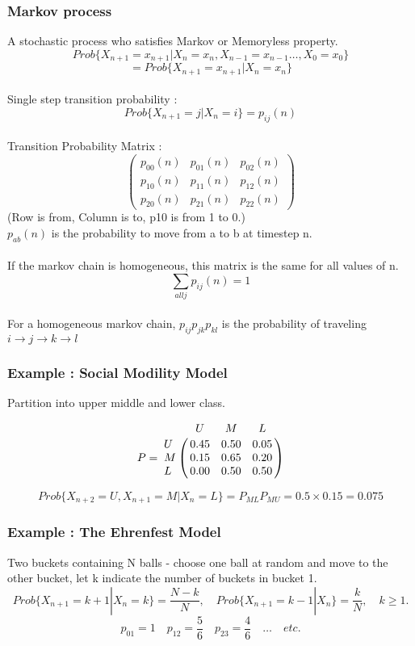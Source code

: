 \documentclass{article}
\begin{document}
	\subsubsection{Markov process}
	A stochastic process who satisfies Markov or Memoryless property. 
	\[Prob\{ X_{n+1} = x_{n+1} | X_n = x_n, X_{n-1} = x_{n-1} \ldots , X_0 = x_0 \}\]
	\[= Prob\{ X_{n+1} = x_{n+1} | X_n = x_n\}\]
	\\Single step transition probability :
	\[Prob\{X_{n+1} = j | X_n = i \} = p_{ij}(n) \]
	\\Transition Probability Matrix : 
	\[ \left( \begin{array}{ccc}
            p_{00}(n) & p_{01}(n) & p_{02}(n) \\
			p_{10}(n) & p_{11}(n) & p_{12}(n) \\
			p_{20}(n) & p_{21}(n) & p_{22}(n) 
	\end{array} \right)\] 
	(Row is from, Column is to, p10 is from 1 to 0.)
 	\\$p_{ab}(n)$ is the probability to move from a to b at timestep n.
	\\
 	\\If the markov chain is homogeneous, this matrix is the same for all values of n. 
	\\$$\sum\limits_{all j}{p_{ij}(n)} = 1$$
	\\For a homogeneous markov chain, $p_{ij} p_{jk} p_{kl}$ is the probability of traveling $i\rightarrow j\rightarrow k\rightarrow l$
	\\\subsubsection{Example : Social Modility Model }
	Partition into upper middle and lower class. 
	
	\[P = \bordermatrix{   
              & U    & M    & L     \cr
            U & 0.45 & 0.50 & 0.05 \cr
			M & 0.15 & 0.65 & 0.20 \cr
			L & 0.00 & 0.50 & 0.50  }
    \]

	$$Prob\{ X_{n+2} = U, X_{n+1} = M | X_n = L \} = P_{ML}P_{MU} = 0.5 \times 0.15 = 0.075 $$
 	\subsubsection{Example : The Ehrenfest Model}
 	Two buckets containing N balls - choose one ball at random and move to the other bucket, let k indicate the number of buckets in bucket 1. 
 	\[ Prob\{ X_{n+1} = k + 1 | X_{n} = k \} = \frac{ N - k}{N}, \quad Prob\{ X_{n+1} = k-1 | X_n \} = \frac{k}{N}, \quad k \geq 1.\] 
 	\[p_{01} = 1 \quad p_{12} = \frac{5}{6} \quad p_{23} = \frac{4}{6} \quad \ldots \quad etc. \]
\end{document}
